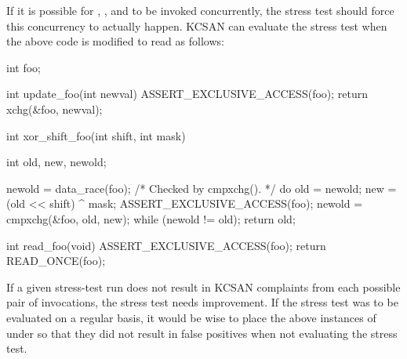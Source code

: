 If it is possible for , , and
 to be invoked concurrently, the stress test should force
this concurrency to actually happen.
KCSAN can evaluate the stress test when the above code is modified to
read as follows:

\begin{VerbatimU}
	int foo;

	int update_foo(int newval)
	{
		ASSERT_EXCLUSIVE_ACCESS(foo);
		return xchg(&foo, newval);
	}

	int xor_shift_foo(int shift, int mask)
	{
		int old, new, newold;

		newold = data_race(foo); /* Checked by cmpxchg(). */
		do {
			old = newold;
			new = (old << shift) ^ mask;
			ASSERT_EXCLUSIVE_ACCESS(foo);
			newold = cmpxchg(&foo, old, new);
		} while (newold != old);
		return old;
	}


	int read_foo(void)
	{
		ASSERT_EXCLUSIVE_ACCESS(foo);
		return READ_ONCE(foo);
	}
\end{VerbatimU}

If a given stress-test run does not result in KCSAN complaints from
each possible pair of  invocations, the
stress test needs improvement.
If the stress test was to be evaluated on a regular basis, it would be
wise to place the above instances of  under
 so that they did not result in false positives when not
evaluating the stress test.
